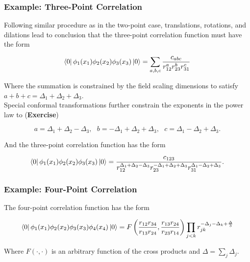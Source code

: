 \subsubsection*{Example: Three-Point Correlation}

\noindent Following similar procedure as in the two-point case, translations, rotations, and dilations lead to conclusion that the three-point correlation function must have the form

\begin{equation}
\bra{0} \phi_1 (x_1) \phi_2 (x_2) \phi_3 (x_3) \ket{0} = \sum_{a,b,c} \frac{c_{abc}}{r_{12}^a r_{23}^b r_{31}^c}
\end{equation}

\noindent Where the summation is constrained by the field scaling dimensions to satisfy $a+b+c = \Delta_1 + \Delta_2 + \Delta_3$. \\

\noindent Special conformal transformations further constrain the exponents in the power law to (\textbf{Exercise})

\begin{equation}
a = \Delta_1 + \Delta_2 - \Delta_3, \,\,\,\, b = -\Delta_1 + \Delta_2 + \Delta_3, \,\,\,\, c = \Delta_1 - \Delta_2 + \Delta_3.
\end{equation}

\noindent And the three-point correlation function has the form

\begin{equation}
\bra{0} \phi_1 (x_1) \phi_2 (x_2) \phi_3 (x_3) \ket{0} = \frac{c_{123}}{r_{12}^{\Delta_1 + \Delta_2 - \Delta_3} r_{23}^{-\Delta_1 + \Delta_2 + \Delta_3} r_{31}^{\Delta_1 - \Delta_2 + \Delta_3}}.
\end{equation}

\subsubsection*{Example: Four-Point Correlation}

\noindent The four-point correlation function has the form

\begin{equation}
\bra{0} \phi_1 (x_1) \phi_2 (x_2) \phi_3 (x_3) \phi_4 (x_4) \ket{0} = F \left( \frac{r_{12} r_{34}}{r_{13} r_{24}}, \frac{r_{13} r_{24}}{r_{23} r_{14}} \right) \prod_{j<k} r_{jk}^{-\Delta_j - \Delta_k + \frac{\Delta}{3}}
\end{equation}

\noindent Where $F(\cdot,\cdot)$ is an arbitrary function of the cross products and $\Delta = \sum_j \Delta_j$.

